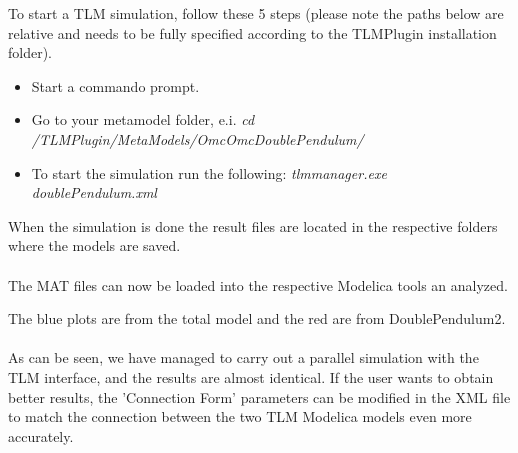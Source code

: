 To start a TLM simulation, follow these 5 steps (please note the paths below are relative and needs to be fully specified according to the TLMPlugin installation folder).

\begin{itemize}
  \item Start a commando prompt.
  \item Go to your metamodel folder, e.i. \textit{cd /TLMPlugin/MetaModels/OmcOmcDoublePendulum/}
  \item To start the simulation run the following: \textit{tlmmanager.exe doublePendulum.xml}
\end{itemize}

When the simulation is done the result files are located in the respective folders where the models are saved. \\\\The MAT files can now be loaded into the respective Modelica tools an analyzed.

The blue plots are from the total model and the red are from DoublePendulum2. \\\\
As can be seen, we have managed to carry out a parallel simulation with the TLM interface, and the results are almost identical. If the user wants to obtain better results, the 'Connection Form' parameters can be modified in the XML file to match the connection between the two TLM Modelica models even more accurately.

